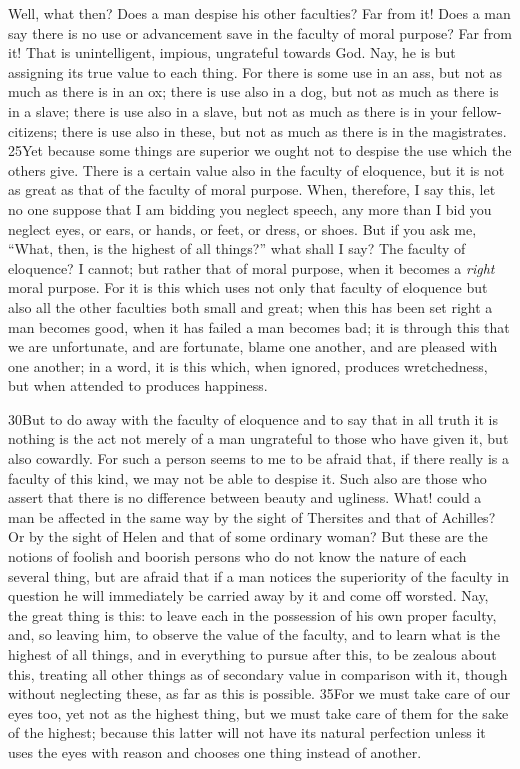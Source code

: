 Well, what then? Does a man despise his other faculties? Far from it! Does a man say there is no use or advancement save in the faculty of moral purpose? Far from it! That is unintelligent, impious, ungrateful towards God. Nay, he is but assigning its true value to each thing. For there is some use in an ass, but not as much as there is in an ox; there is use also in a dog, but not as much as there is in a slave; there is use also in a slave, but not as much as there is in your fellow-citizens; there is use also in these, but not as much as there is in the magistrates. 25Yet because some things are superior we ought not to despise the use which the others give. There is a certain value also in the faculty of eloquence, but it is not as great as that of the faculty of moral purpose. When, therefore, I say this, let no one suppose that I am bidding you neglect speech, any more than I bid you neglect eyes, or ears, or hands, or feet, or dress, or shoes. But if you ask me, ``What, then, is the highest of all things?'' what shall I say? The faculty of eloquence? I cannot; but rather that of moral purpose, when it becomes a \emph{right} moral purpose. For it is this which uses not only that faculty of eloquence but also all the other faculties both small and great; when this has been set right a man becomes good, when it has failed a man becomes bad; it is through this that we are unfortunate, and are fortunate, blame one another, and are pleased with one another; in a word, it is this which, when ignored, produces wretchedness, but when attended to produces happiness.

30But to do away with the faculty of eloquence and to say that in all truth it is nothing is the act not merely of a man ungrateful to those who have given it, but also cowardly. For such a person seems to me to be afraid that, if there really is a faculty of this kind, we may not be able to despise it. Such also are those who assert that there is no difference between beauty and ugliness. What! could a man be affected in the same way by the sight of Thersites and that of Achilles? Or by the sight of Helen and that of some ordinary woman? But these are the notions of foolish and boorish persons who do not know the nature of each several thing, but are afraid that if a man notices the superiority of the faculty in question he will immediately be carried away by it and come off worsted. Nay, the great thing is this: to leave each in the possession of his own proper faculty, and, so leaving him, to observe the value of the faculty, and to learn what is the highest of all things, and in everything to pursue after this, to be zealous about this, treating all other things as of secondary value in comparison with it, though without neglecting these, as far as this is possible. 35For we must take care of our eyes too, yet not as the highest thing, but we must take care of them for the sake of the highest; because this latter will not have its natural perfection unless it uses the eyes with reason and chooses one thing instead of another.

